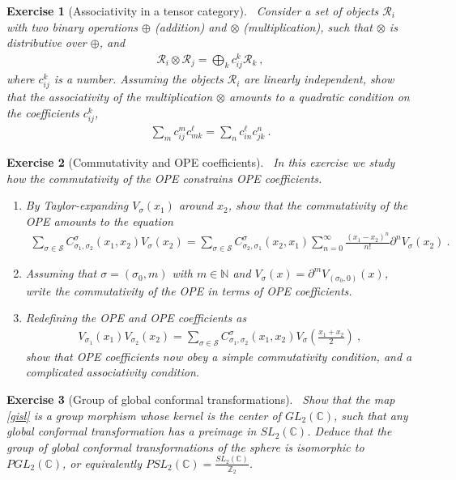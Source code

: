 \documentclass[12pt, a4paper, notitlepage, twoside]{report}
\numberwithin{equation}{section}
\theoremstyle{break}
\newtheorem{exo}{Exercise}[chapter]
\begin{document}
\begin{exo}[Associativity in a tensor category]
 ~\label{exoten}
Consider a set of objects $\mathcal{R}_i$ with two binary operations $\oplus$ (addition) and $\otimes$ (multiplication), such that $\otimes$ is distributive over $\oplus$, and
\begin{align}
 \mathcal{R}_i \otimes \mathcal{R}_j = \bigoplus_k c_{ij}^k \mathcal{R}_k\ ,
\end{align}
where $c_{ij}^k$ is a number.
Assuming the objects $\mathcal{R}_i$ are linearly independent, show that the associativity of the multiplication $\otimes$ amounts to a quadratic condition on the coefficients $c_{ij}^k$,
\begin{align}
 \sum_m c_{ij}^m c_{mk}^\ell = \sum_n c_{in}^\ell c_{jk}^n\ .
\end{align}
\end{exo}

\begin{exo}[Commutativity and OPE coefficients]
 ~\label{exocva}
In this exercise we study how the commutativity of the OPE constrains OPE coefficients.
\begin{enumerate}
 \item By Taylor-expanding $V_\sigma(x_1)$ around $x_2$, show that the commutativity of the OPE amounts to the equation
 \begin{align}
  \sum_{\sigma\in \mathcal{S}} C_{\sigma_1,\sigma_2}^{\sigma}(x_1,x_2) V_{\sigma}(x_2) 
  = \sum_{\sigma\in \mathcal{S}} C_{\sigma_2,\sigma_1}^{\sigma}(x_2,x_1)
  \sum_{n=0}^\infty \frac{(x_1-x_2)^n}{n!}\partial^n
  V_{\sigma}(x_2)\ .
 \end{align}
 \item Assuming that $\sigma = (\sigma_0,m)$ with $m\in\mathbb{N}$ and $V_\sigma(x) = \partial^m V_{(\sigma_0,0)}(x)$, write the commutativity of the OPE in terms of OPE coefficients. 
 \item Redefining the OPE and OPE coefficients as 
 \begin{align}
  V_{\sigma_1}(x_1)V_{\sigma_2}(x_2) = \sum_{\sigma\in \mathcal{S}} C_{\sigma_1,\sigma_2}^{\sigma}(x_1,x_2) V_{\sigma}(\tfrac{x_1+x_2}{2})\ ,
 \end{align}
 show that OPE coefficients now obey a simple commutativity condition, and a complicated associativity condition.
\end{enumerate}
\end{exo}


\begin{exo}[Group of global conformal transformations]
 ~\label{exoiso}
Show that the map \eqref{gisl} is a group morphism whose kernel is the center of $GL_2({\mathbb{C}})$, such that any global conformal transformation has a preimage in $SL_2(\mathbb{C})$.
Deduce that the group of global conformal transformations of the sphere is isomorphic to $PGL_2({\mathbb{C}})$, or equivalently $PSL_2(\mathbb{C}) = \frac{SL_2(\mathbb{C})}{\mathbb{Z}_2}$.
\end{exo}
\end{document}
